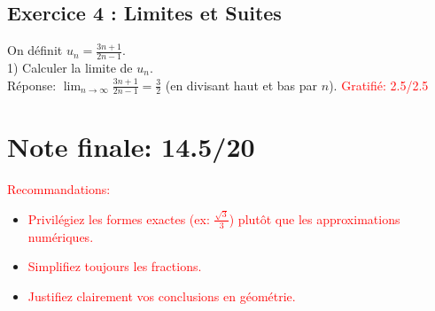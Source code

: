 \documentclass{article}
\begin{document}
\subsection*{Exercice 4 : Limites et Suites}
On définit $u_n = \frac{3n + 1}{2n - 1}$.\\
1) Calculer la limite de $u_n$.\\
Réponse: $\lim_{n \to \infty} \frac{3n + 1}{2n - 1} = \frac{3}{2}$ (en divisant haut et bas par $n$). \textcolor{red}{Gratifié: 2.5/2.5}

\section*{Note finale: 14.5/20}

\textcolor{red}{Recommandations:}
\begin{itemize}
\item \textcolor{red}{Privilégiez les formes exactes (ex: $\frac{\sqrt{3}}{3}$) plutôt que les approximations numériques.}
\item \textcolor{red}{Simplifiez toujours les fractions.}
\item \textcolor{red}{Justifiez clairement vos conclusions en géométrie.}
\end{itemize}
\end{document}
